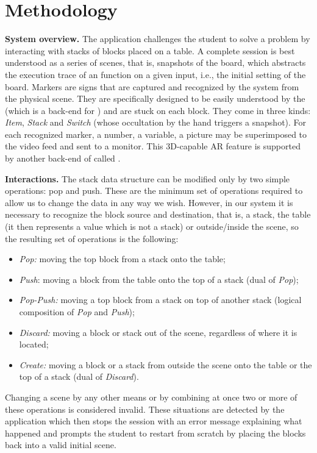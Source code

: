 
\section{Methodology}

\noindent\textbf{System overview.} The application challenges the
student to solve a problem by interacting with stacks of blocks placed
on a table. A complete session is best understood as a series of
scenes, that is, snapshots of the board, which abstracts the execution
trace of an \erlang function on a given input, i.e., the initial
setting of the board. Markers are signs that are captured and
recognized by the system from the physical scene. They are
specifically designed to be easily understood by the \artoolkit (which
is a back\hyp{}end for \osgart) and are stuck on each block. They come
in three kinds: \textsl{Item}, \textsl{Stack} and \textsl{Switch}
(whose occultation by the hand triggers a snapshot). For each
recognized marker, a number, a variable, a picture may be superimposed
to the video feed and sent to a monitor. This 3D\hyp{}capable AR
feature is supported by another back\hyp{}end of \osgart called \osg.

\medskip

\noindent\textbf{Interactions.} The stack data structure can be
modified only by two simple operations: pop and push. These are the
minimum set of operations required to allow us to change the data in
any way we wish. However, in our system it is necessary to recognize
the block source and destination, that is, a stack, the table (it then
represents a value which is not a stack) or outside/inside the scene,
so the resulting set of operations is the following:
\begin{itemize}

  \item \textsl{Pop:} moving the top block from a stack onto the
    table;

  \item \textsl{Push}: moving a block from the table onto the top of a
    stack (dual of \textsl{Pop});

  \item \textsl{Pop-Push:} moving a top block from a stack on top of
    another stack (logical composition of \textsl{Pop} and
    \textsl{Push});

  \item \textsl{Discard:} moving a block or stack out of the scene,
    regardless of where it is located;

  \item \textsl{Create:} moving a block or a stack from outside the
    scene onto the table or the top of a stack (dual of
    \textsl{Discard}).
    
\end{itemize}
Changing a scene by any other means or by combining at once two or
more of these operations is considered invalid. These situations are
detected by the application which then stops the session with an error
message explaining what happened and prompts the student to restart
from scratch by placing the blocks back into a valid initial scene.

